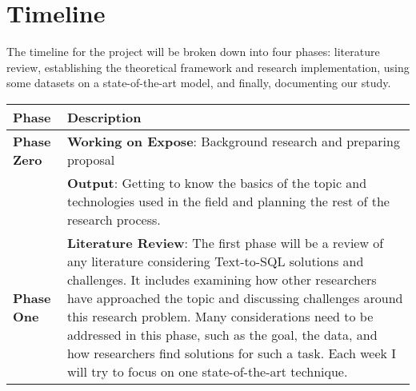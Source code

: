
\newpage
\section{Timeline}

The timeline for the project will be broken down into four phases: literature review, establishing the theoretical framework and research implementation, using some datasets on a state-of-the-art model, and finally, documenting our study.

\begin{tabular}{|l|p{12cm}|}
    \hline
    Phase                & Description                                                                                                                                                                                                                                                                                                                                                                                                                                                             \\
    \hline
    \textbf{Phase Zero}  & \textbf{Working on Expose}: Background research and preparing proposal                                                                                                                                                                                                                                                                                                                                                                                                  \\
                         & \textbf{Output}: Getting to know the basics of the topic and technologies used in the field and planning the rest of the research process.                                                                                                                                                                                                                                                                                                                              \\
    \hline
    \textbf{Phase One}   & \textbf{Literature Review}: The first phase will be a review of any literature considering Text-to-SQL solutions and challenges. It includes examining how other researchers have approached the topic and discussing challenges around this research problem. Many considerations need to be addressed in this phase, such as the goal, the data, and how researchers find solutions for such a task. Each week I will try to focus on one state-of-the-art technique. \\

\end{tabular}
